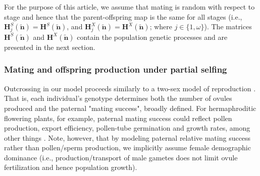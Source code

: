 \documentclass[11pt]{article}
\def\mbf#1{\mathbf{#1}}
\def\mcal#1{\mathcal{#1}}
\begin{document}

For the purpose of this article, we assume that mating is random with respect to stage and hence that the parent-offspring map is the same for all stages (i.e., $\mbf{H}^S_{j}(\tilde{\mbf{n}}) = \mbf{H}^S(\tilde{\mbf{n}})$, and $\mbf{H}^X_{j}(\tilde{\mbf{n}}) = \mbf{H}^X(\tilde{\mbf{n}})$; where $j \in \{1,\omega\}$). The matrices $\mbf{H}^S(\tilde{\mbf{n}})$ and $\mbf{H}^X(\tilde{\mbf{n}})$ contain the population genetic processes and are presented in the next section.

\subsubsection*{Mating and offspring production under partial selfing}
 Outcrossing in our model proceeds similarly to a two-sex model of reproduction \citep{deVriesCaswell2019b}. That is, each individual's genotype determines both the number of ovules produced and the paternal "mating success", broadly defined. For hermaphroditic flowering plants, for example, paternal mating success could reflect pollen production, export efficiency, pollen-tube germination and growth rates, among other things \citep{LloydWebb1986, WangBarrett2020, Harder2016}. Note, however, that by modeling paternal relative mating success rather than pollen/sperm production, we implicitly assume female demographic dominance (i.e., production/transport of male gametes does not limit ovule fertilization and hence population growth).
\end{document}
